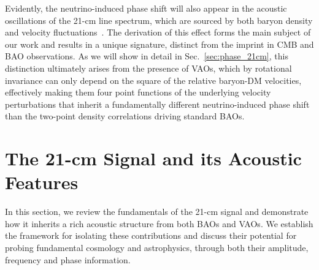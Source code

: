 \documentclass[floats,floatfix,showpacs,amssymb,prd,twocolumn,superscriptaddress,nofootinbib,reprint,preprintnumbers]{revtex4-2}
\begin{document}
Evidently, the neutrino-induced phase shift will also appear in the acoustic oscillations of the 21-cm line spectrum, which are sourced by both baryon density and velocity fluctuations~\citep*[see also \citep{barkana06, mao12}]{munoz19, munoz19b, Cruz:2024fsv}. The derivation of this effect forms the main subject of our work and results in a unique signature, distinct from the imprint in CMB and BAO observations. As we will show in detail in Sec.~\ref{sec:phase_21cm}, this distinction ultimately arises from the presence of VAOs, which by rotational invariance can only depend on the square of the relative baryon-DM velocities, effectively making them four point functions of the underlying velocity perturbations that inherit a fundamentally different neutrino-induced phase shift than the two-point density correlations driving standard BAOs.

\section{The 21-cm Signal and its Acoustic Features}\label{sec:3}

In this section, we review the fundamentals of the 21-cm signal and demonstrate how it inherits a rich acoustic structure from both BAOs and VAOs. We establish the framework for isolating these contributions and discuss their potential for probing fundamental cosmology and astrophysics, through both their amplitude, frequency and phase information.
\end{document}
